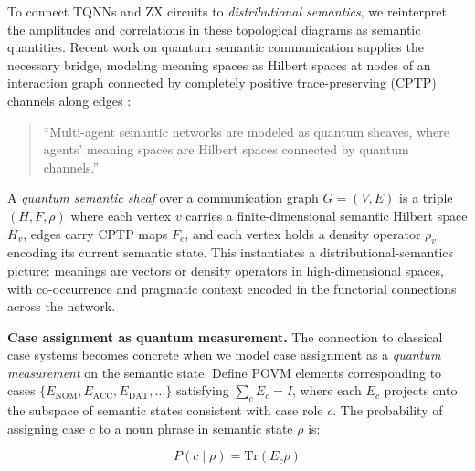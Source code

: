 \documentclass[
]{article}
\begin{document}
To connect TQNNs and ZX circuits to \emph{distributional semantics}, we
reinterpret the amplitudes and correlations in these topological
diagrams as semantic quantities. Recent work on quantum semantic
communication supplies the necessary bridge, modeling meaning spaces as
Hilbert spaces at nodes of an interaction graph connected by completely
positive trace-preserving (CPTP) channels along edges
\citep{thomas2025quantum}:

\begin{quote}
``Multi-agent semantic networks are modeled as quantum sheaves, where
agents' meaning spaces are Hilbert spaces connected by quantum
channels.'' \citep{thomas2025quantum}
\end{quote}

A \emph{quantum semantic sheaf} over a communication graph \(G=(V,E)\)
is a triple \((H,F,\rho)\) where each vertex \(v\) carries a
finite-dimensional semantic Hilbert space \(H_v\), edges carry CPTP maps
\(F_e\), and each vertex holds a density operator \(\rho_v\) encoding
its current semantic state. This instantiates a distributional-semantics
picture: meanings are vectors or density operators in high-dimensional
spaces, with co-occurrence and pragmatic context encoded in the
functorial connections across the network.

\textbf{Case assignment as quantum measurement.} The connection to
classical case systems becomes concrete when we model case assignment as
a \emph{quantum measurement} on the semantic state. Define POVM elements
corresponding to cases
\(\{E_{\text{NOM}}, E_{\text{ACC}}, E_{\text{DAT}}, \ldots\}\)
satisfying \(\sum_c E_c = I\), where each \(E_c\) projects onto the
subspace of semantic states consistent with case role \(c\). The
probability of assigning case \(c\) to a noun phrase in semantic state
\(\rho\) is:

\begin{equation}
P(c \mid \rho) = \text{Tr}(E_c \rho)
\label{eq:eq-8-1}
\end{equation}
\end{document}
